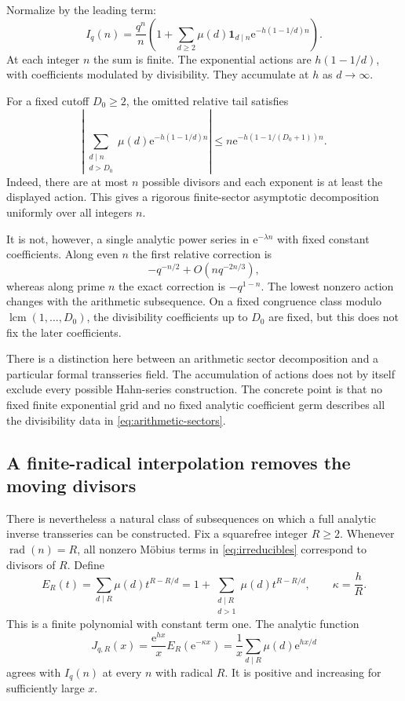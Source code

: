 \documentclass[11pt]{article}
\numberwithin{equation}{section}
\theoremstyle{definition}
\newcommand{\rad}{\operatorname{rad}}
\newcommand{\ee}{\mathrm e}
\newcommand{\one}{\mathbf 1}
\begin{document}
Normalize by the leading term:
\begin{equation}\label{eq:arithmetic-sectors}
 I_q(n)=\frac{q^n}{n}
 \left(1+\sum_{d\ge2}\mu(d)\one_{d\mid n}
       \ee^{-h(1-1/d)n}\right).
\end{equation}
At each integer $n$ the sum is finite. The exponential actions are
$h(1-1/d)$, with coefficients modulated by divisibility. They accumulate at $h$ as $d\to\infty$.

For a fixed cutoff $D_0\ge2$, the omitted relative tail satisfies
\begin{equation}\label{eq:arithmetic-cutoff}
 \left|\sum_{\substack{d\mid n\\d>D_0}}
       \mu(d)\ee^{-h(1-1/d)n}\right|
 \le n\ee^{-h(1-1/(D_0+1))n}.
\end{equation}
Indeed, there are at most $n$ possible divisors and each exponent is at least the displayed action. This gives a rigorous finite-sector asymptotic decomposition uniformly over all integers $n$.

It is not, however, a single analytic power series in $\ee^{-\lambda n}$ with fixed constant coefficients. Along even $n$ the first relative correction is
\[
 -q^{-n/2}+O(nq^{-2n/3}),
\]
whereas along prime $n$ the exact correction is $-q^{1-n}$. The lowest nonzero action changes with the arithmetic subsequence. On a fixed congruence class modulo $\operatorname{lcm}(1,\ldots,D_0)$, the divisibility coefficients up to $D_0$ are fixed, but this does not fix the later coefficients.

There is a distinction here between an arithmetic sector decomposition and a particular formal transseries field. The accumulation of actions does not by itself exclude every possible Hahn-series construction. The concrete point is that no fixed finite exponential grid and no fixed analytic coefficient germ describes all the divisibility data in \eqref{eq:arithmetic-sectors}.

\subsection{A finite-radical interpolation removes the moving divisors}

There is nevertheless a natural class of subsequences on which a full analytic inverse transseries can be constructed. Fix a squarefree integer $R\ge2$. Whenever $\rad(n)=R$, all nonzero M\"obius terms in \eqref{eq:irreducibles} correspond to divisors of $R$. Define
\begin{equation}\label{eq:ER}
 E_R(t)=\sum_{d\mid R}\mu(d)t^{R-R/d}
       =1+\sum_{\substack{d\mid R\\d>1}}\mu(d)t^{R-R/d},
 \qquad \kappa=\frac hR.
\end{equation}
This is a finite polynomial with constant term one. The analytic function
\begin{equation}\label{eq:fixedradical-function}
 J_{q,R}(x)=\frac{\ee^{hx}}x E_R(\ee^{-\kappa x})
          =\frac1x\sum_{d\mid R}\mu(d)\ee^{hx/d}
\end{equation}
agrees with $I_q(n)$ at every $n$ with radical $R$. It is positive and increasing for sufficiently large $x$.
\end{document}
